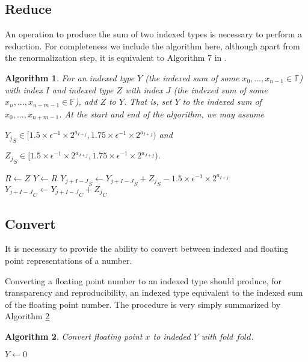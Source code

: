\documentclass[12pt]{article}
\providecommand{\F}{\ensuremath{\mathbb{F}}}
\theoremstyle{plain}
\newtheorem{alg}{Algorithm}[section]
\begin{document}
  \subsection{Reduce}
    An operation to produce the sum of two indexed types is necessary to perform a reduction. For completeness we include the algorithm here, although apart from the renormalization step, it is equivalent to Algorithm $7$ in \cite{repsum}.
    \begin{alg}
      For an indexed type $Y$ (the indexed sum of some $x_0, ..., x_{n - 1} \in \F$) with index $I$ and indexed type $Z$ with index $J$ (the indexed sum of some $x_n, ..., x_{n + m - 1} \in \F$), add $Z$ to $Y$. That is, set $Y$ to the indexed sum of $x_0, ..., x_{n + m - 1}$. At the start and end of the algorithm, we may assume

${Y_j}_S \in [1.5 \times \epsilon^{-1}\times 2^{a_{I + j}}, 1.75 \times \epsilon^{-1}\times 2^{a_{I + j}})$ and

${Z_j}_S \in [1.5 \times \epsilon^{-1}\times 2^{a_{J + j}}, 1.75 \times \epsilon^{-1}\times 2^{a_{J + j}}).$
      \begin{algorithmic}
            \State $R \gets Z$
            \State {}
            \State $Y \gets R$
          \EndIf
            \State ${Y_{j + I - J}}_S \gets {Y_{j + I - J}}_S + {Z_j}_S - 1.5 \times \epsilon^{-1} \times 2^{a_{I + j}}$
            \State ${Y_{j + I - J}}_C \gets {Y_{j + I - J}}_C + {Z_j}_C$
          \EndFor
          \State {}
        \EndFunction
      \end{algorithmic}
      \label{alg:reduce}
    \end{alg}

  \subsection{Convert}
    \label{sec:convert}
    It is necessary to provide the ability to convert between indexed and floating point representations of a number.

    Converting a floating point number to an indexed type should produce, for transparency and reproducibility, an indexed type equivalent to the indexed sum of the floating point number.
    The procedure is very simply summarized by Algorithm \ref{alg:conv2indexed}
    \begin{alg}
      Convert floating point $x$ to indeded $Y$ with fold $fold$.
      \begin{algorithmic}
          \State $Y \gets 0$
          \State {}
          \State {}
          \State {}
        \EndFunction
      \end{algorithmic}
      \label{alg:conv2indexed}
    \end{alg}
\end{document}
